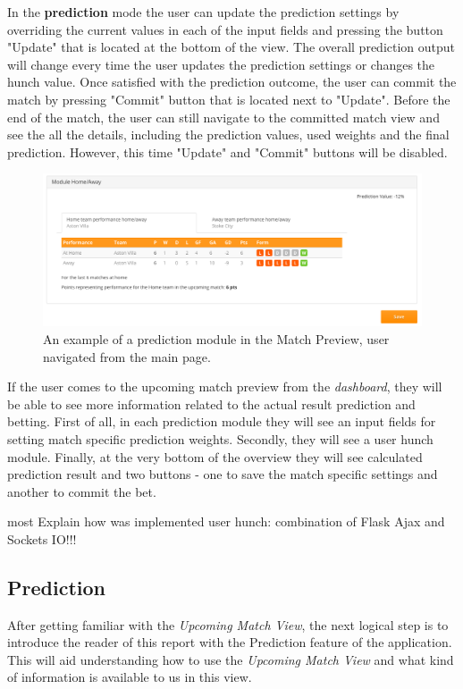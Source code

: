 In the \textbf{prediction} mode the user can update the prediction settings by overriding the current values in each of the input fields and pressing the button "Update" that is located at the bottom of the view. The overall prediction output will change every time the user updates the prediction settings or changes the hunch value. Once satisfied with the prediction outcome, the user can commit the match by pressing "Commit" button that is located next to "Update". Before the end of the match, the user can still navigate to the committed match view and see the all the details, including the prediction values, used weights and the final prediction. However, this time "Update" and "Commit" buttons will be disabled.

\begin{figure}[H]
	\begin{center}
		\includegraphics[width=.90\textwidth]{impl/images/matchoverviewex_from_main_page}
		\caption{An example of a prediction module in the Match Preview, user navigated from the main page.} \label{fig:using: matchoverviewex_from_main_page}
	\end{center}
\end{figure}

If the user comes to the upcoming match preview from the \emph{dashboard}, they will be able to see more information related to the actual result prediction and betting.
First of all, in each prediction module they will see an input fields for setting match specific prediction weights. Secondly, they will see a user hunch module. Finally, at the very bottom of the overview they will see calculated prediction result and two buttons - one to save the match specific settings and another to commit the bet.


most Explain how was implemented user hunch: combination of Flask Ajax and Sockets IO!!!
 
\subsection{Prediction}
\label{subsec:predictionimplementation}
After getting familiar with the \emph{Upcoming Match View}, the next logical step is to introduce the reader of this report with the Prediction feature of the application. This will aid understanding how to use the \emph{Upcoming Match View} and what kind of information is available to us in this view.

